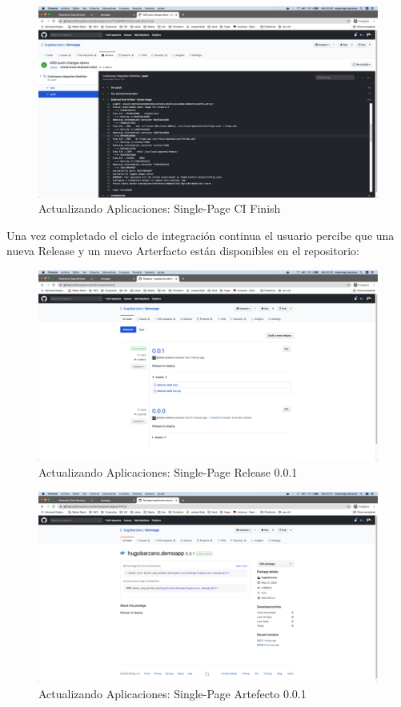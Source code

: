 \documentclass[a4paper,11pt]{book}
\begin{document}
  \begin{figure}[H]
\centering
\includegraphics[scale=0.2]{imagenes/casouso/2_7.png}
\caption{ Actualizando Aplicaciones: Single-Page CI Finish  }
\end{figure}

 Una vez completado el ciclo de integración continua el usuario percibe que una nueva Release y un nuevo Arterfacto están disponibles en el repositorio:
 
   \begin{figure}[H]
\centering
\includegraphics[scale=0.2]{imagenes/casouso/2_8.png}
\caption{  Actualizando Aplicaciones: Single-Page Release 0.0.1  }
\end{figure}

  \begin{figure}[H]
\centering
\includegraphics[scale=0.2]{imagenes/casouso/2_9.png}
\caption{  Actualizando Aplicaciones: Single-Page Artefecto 0.0.1 }
\end{figure}
 
\end{document}
